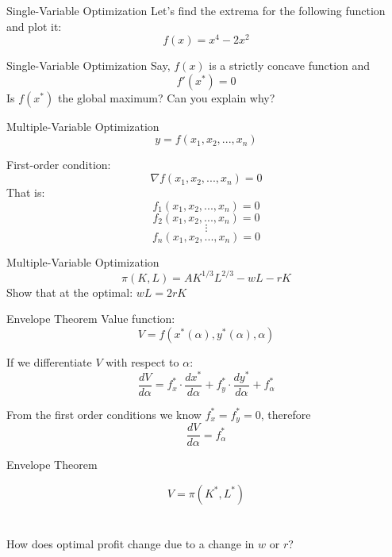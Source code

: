 \documentclass{./../../Latex/teaching_slides}
\begin{document}
\begin{frame}{Single-Variable Optimization}
Let's find the extrema for the following function and plot it:
$$ f(x) = x^4-2x^2 $$
\end{frame}

\begin{frame}{Single-Variable Optimization}
Say, $f(x)$ is a strictly concave function and 
$$f'(x^*) = 0 $$ 
Is $f(x^*)$ the global maximum? Can you explain why?
\end{frame}

\begin{frame}{Multiple-Variable Optimization}
$$ y = f(x_1, x_2,...,x_n) $$

First-order condition:
$$ \nabla f (x_1,x_2,...,x_n)  = 0 $$
That is:
$$ f_1(x_1,x_2,...,x_n) = 0$$
$$ f_2(x_1,x_2,...,x_n) = 0$$
$$ \vdots $$ 
$$ f_n(x_1,x_2,...,x_n) = 0$$

\end{frame}

\begin{frame}{Multiple-Variable Optimization}
\vspace{-1.5em}
$$ \pi(K, L) = AK^{1/3}L^{2/3}-wL-rK  $$ 
Show that at the optimal: $wL = 2 rK$ \\
\end{frame}

\begin{frame}{Envelope Theorem}
Value function:
$$
V=f\left(x^{*}(\alpha), y^{*}(\alpha), \alpha\right)
$$

\vspace{0.5em}
If we differentiate $V$ with respect to $\alpha$:
$$
\frac{d V}{d \alpha} =f_{x}^{*} \cdot \frac{d x^{*}}{d \alpha}+f_{y}^{*} \cdot \frac{d y^{*}}{d \alpha}+f_{\alpha}^{*}
$$

\vspace{0.5em}
From the first order conditions we know $f_{x}^{*}=f_{y}^{*}=0$, therefore
$$
\frac{d V}{d \alpha}=f_{\alpha}^{*}
$$
\end{frame}

\begin{frame}{Envelope Theorem}

$$ V= \pi(K^*, L^*)$$ \\~\\

How does optimal profit change due to a change in $w$ or $r$?
\end{frame}
\end{document}
